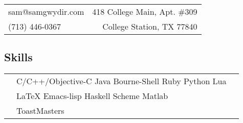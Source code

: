 \documentclass[margin,line,12pt]{res}
\begin{document}
\hfill
\vspace*{-.45in}
\begin{tabular}{l r}
sam@samgwydir.com & 418 College Main, Apt. \#309\\
(713) 446-0367 & College Station, TX 77840
\end{tabular}

\vspace*{.1in}
{\color{Black}
\begin{resume}

\vspace*{.05in}
{\color{Black}
  \vspace{-.10in}
  \section{\sc Skills}}
\hspace{-.35in}
{\renewcommand{\arraystretch}{1.25}
  \renewcommand{\tabcolsep}{0.175cm}
  \begin{tabular}{l l l}
    & C/C++/Objective-C Java Bourne-Shell Ruby Python Lua & \\
    & \LaTeX{} Emacs-lisp Haskell Scheme Matlab & \\
    & ToastMasters & \\
  \end{tabular}}



\end{resume}}
\end{document}
